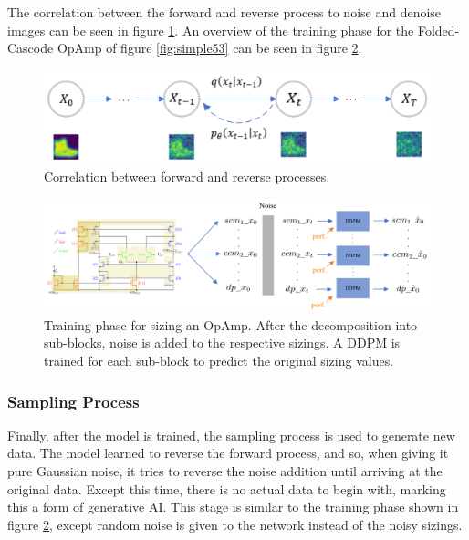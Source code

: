 \documentclass[conference]{IEEEtran}
\begin{document}
	The correlation between the forward and reverse process to noise and denoise images can be seen in figure \ref{fig:forward_reverse}. An overview of the training phase for the Folded-Cascode OpAmp of figure \ref{fig:simple53} can be seen in figure \ref{fig:DDPMtraining}.
	
	\begin{figure}[h]
		\centering
		\includegraphics[width=\linewidth]{figures/ForwardReverseDDPM}
		\setlength{\abovecaptionskip}{0ex}%
		\setlength{\belowcaptionskip}{-2ex}%
		\caption{Correlation between forward and reverse processes.}
		\label{fig:forward_reverse}
	\end{figure}
	
	\begin{figure}[h]
		\centering
		\includegraphics[width=\linewidth]{figures/DDPMSubBlockTraining}
		\setlength{\abovecaptionskip}{0ex}%
		\setlength{\belowcaptionskip}{-2ex}%
		\caption{Training phase for sizing an OpAmp. After the decomposition into sub-blocks, noise is added to the respective sizings. A DDPM is trained for each sub-block to predict the original sizing values.}
		\label{fig:DDPMtraining}
	\end{figure}
	
	\subsubsection{Sampling Process}
	Finally, after the model is trained, the sampling process is used to generate new data. The model learned to reverse the forward process, and so, when giving it pure Gaussian noise, it tries to reverse the noise addition until arriving at the original data. Except this time, there is no actual data to begin with, marking this a form of generative AI. This stage is similar to the training phase shown in figure \ref{fig:DDPMtraining}, except random noise is given to the network instead of the noisy sizings.
	
\end{document}
